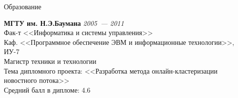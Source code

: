 \documentclass{resume} %
\begin{document}

\begin{rSection}{Образование}

{\bf МГТУ им. Н.Э.Баумана} \hfill {\em 2005~--- 2011} \\
Фак-т <<Информатика и системы управления>> \\ 
Каф. <<Программное обеспечение ЭВМ и информационные технологии>>, ИУ-7 \\
Магистр техники и технологии \\
Тема дипломного проекта: <<Разработка метода онлайн-кластеризации новостного потока>> \\
Средний балл в дипломе: 4.6

\end{rSection}

\end{document}
